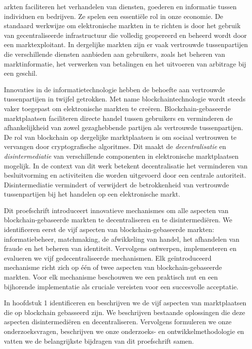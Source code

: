 {

arkten faciliteren het verhandelen van diensten, goederen en informatie tussen individuen en bedrijven.
Ze spelen een essentiële rol in onze economie.
De standaard werkwijze om elektronische markten in te richten is door het gebruik van gecentraliseerde infrastructuur die volledig geopereerd en beheerd wordt door een marktexploitant.
In dergelijke markten zijn er vaak vertrouwde tussenpartijen die verschillende diensten aanbieden aan gebruikers, zoals het beheren van marktinformatie, het verwerken van betalingen en het uitvoeren van arbitrage bij een geschil.

Innovaties in de informatietechnologie hebben de behoefte aan vertrouwde tussenpartijen in twijfel getrokken.
Met name blockchaintechnologie wordt steeds vaker toegepast om elektronische markten te creëren.
Blockchain-gebaseerde marktplaatsen faciliteren directe handel tussen gebruikers en verminderen de afhankelijkheid van zowel gezaghebbende partijen als vertrouwde tussenpartijen.
De rol van blockchain op dergelijke marktplaatsen is om sociaal vertrouwen te vervangen door cryptografische algoritmes.
Dit maakt de \emph{decentralisatie} en \emph{disintermediatie} van verschillende componenten in elektronische marktplaatsen mogelijk.
In de context van dit werk betekent decentralisatie het verminderen van besluitvorming en activiteiten die worden uitgevoerd door een centrale autoriteit.
Disintermediatie vermindert of verwijdert de betrokkenheid van vertrouwde tussenpartijen bij het handelen op een elektronische markt.

Dit proefschrift introduceert innovatieve mechanismes om alle aspecten van blockchain-gebaseerde markten te decentraliseren en te disintermediëren.
We identificeren eerst de vijf aspecten van blockchain-gebaseerde markten: informatiebeheer, matchmaking, de afwikkeling van handel, het afhandelen van fraude en het beheren van identiteit.
Vervolgens ontwerpen, implementeren en evalueren we vijf gedecentraliseerde mechanismen.
Elk geïntroduceerd mechanisme richt zich op één of twee aspecten van blockchain-gebaseerde markten.
Voor elk mechanisme beschouwen we een praktisch nut en een bijhorende implementatie als cruciale vereisten voor een succesvolle acceptatie.

In hoofdstuk 1 identificeren en beschrijven we de vijf aspecten van marktplaatsen die op blockchain gebasseerd zijn.
We beschrijven bestaande oplossingen die deze aspecten disintermediëren en decentraliseren.
Vervolgens formuleren we onze onderzoeksvragen, beschrijven we onze onderzoeks- en ontwikkelmethodologie en vatten we de belangrijkste bijdragen van dit proefschrift samen.

}
